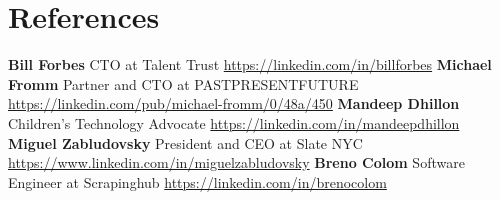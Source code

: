 \documentclass[11pt,a4paper,english]{moderncv}
\begin{document}
\section{References}
\cvlistitem
{
    \textbf{Bill Forbes}
    \newline{}
    CTO at Talent Trust
    \newline{}
    \url{https://linkedin.com/in/billforbes}
}
\cvlistitem
{
    \textbf{Michael Fromm}
    \newline{}
    Partner and CTO at PASTPRESENTFUTURE
    \newline{}
    \url{https://linkedin.com/pub/michael-fromm/0/48a/450}
}
\cvlistitem
{
    \textbf{Mandeep Dhillon}
    \newline{}
    Children's Technology Advocate 
    \newline{}
    \url{https://linkedin.com/in/mandeepdhillon}
}
\cvlistitem
{
    \textbf{Miguel Zabludovsky}
    \newline{}
    President and CEO at Slate NYC
    \newline{}
    \url{https://www.linkedin.com/in/miguelzabludovsky}
}
\cvlistitem
{
    \textbf{Breno Colom}
    \newline{}
    Software Engineer at Scrapinghub
    \newline{}
    \url{https://linkedin.com/in/brenocolom}
}
\end{document}
